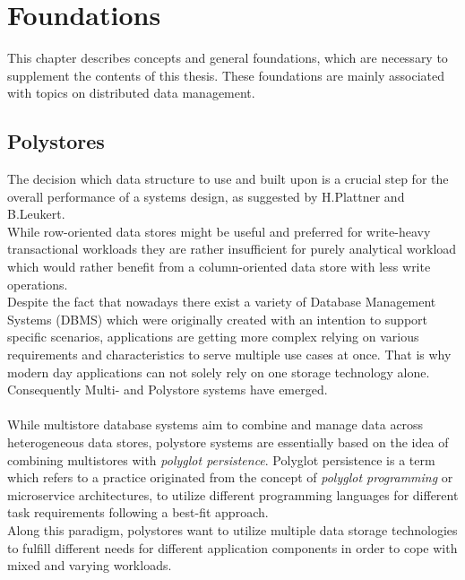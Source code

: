 \chapter{Foundations}
\label{c:Foundation}

This chapter describes concepts and general foundations, which are necessary to supplement 
the contents of this thesis. These foundations are mainly associated with topics on distributed data management.


\section{Polystores}

The decision which data structure to use and built upon is a crucial step for the overall performance of a systems design, as suggested by
H.Plattner and B.Leukert\cite{plattner2015}.\\
While row-oriented data stores might be useful and preferred for write-heavy transactional 
workloads they are rather insufficient for purely analytical workload which would rather benefit from a
column-oriented data store with less write operations\cite{sigmond2008}.\\

Despite the fact that nowadays there exist a variety of Database Management Systems (DBMS) which were originally created with an intention to
support specific scenarios,
applications are getting more complex relying on various requirements and characteristics 
to serve multiple use cases at once.
That is why modern day applications can not solely rely on one storage technology alone. 
Consequently Multi- and Polystore systems have emerged. \\
\\
While multistore database systems aim to combine and manage data across heterogeneous data stores,
polystore systems are essentially based on the idea of combining multistores with
\textit{polyglot persistence}\cite{polypheny2020}.
Polyglot persistence is a term which refers to a practice originated from the concept 
of \textit{polyglot programming} or microservice architectures, to utilize different 
programming languages for different task requirements following a best-fit approach\cite{fowler2011}. \\
Along this paradigm, polystores want to utilize multiple data storage technologies to
fulfill different needs for different application components in order to cope
with mixed and varying workloads.


